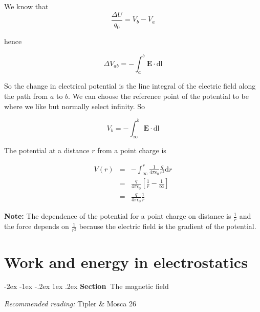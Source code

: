 \documentclass[
]{book}
\makeatletter
\renewcommand\section{%
\@startsection{section}{1}{\z@}%
              {-2ex \@plus -1ex \@minus -.2ex}%
              {1ex \@plus .2ex}%
              {\sffamily\bfseries\large\noindent Section~}}
\makeatother
\begin{document}
We know that
\begin{equation}
\label{eq:DeltaU2}
\frac{\Delta U}{q_0} = V_b - V_a
\end{equation}

hence

\begin{equation}
\label{eq:DeltaVab}
\Delta V_{ab} = -\int_a^b \mathbf{E} \cdot \mathrm{d}\mathrm{l}
\end{equation}

So the change in electrical potential is the line integral of the
electric field along the path from \(a\) to \(b\). We can choose the
reference point of the potential to be where we like but normally select
infinity. So

\begin{equation}
\label{eq:Vb}
V_b = -\int_\infty^b \mathbf{E} \cdot \mathrm{d}\mathrm{l}
\end{equation}

The potential at a distance \(r\) from a point charge is

\begin{equation}
\label{eq:V-r}
\begin{array}{rcll}
V(r) &=& -\int_\infty^r \frac{1}{4\pi\epsilon_0} \frac{q}{r^2} \mathrm{d} r \\
     &=& \frac{q}{4\pi\epsilon_0} \left[ \frac{1}{r} - \frac{1}{\infty} \right] \\
     &=& \frac{q}{4\pi\epsilon_0} \frac{1}{r}
\end{array}
\end{equation}

\textbf{Note:} The dependence of the potential for a point charge on distance
is \(\frac{1}{r}\) and the force depends on \(\frac{1}{r^2}\) because the
electric field is the gradient of the potential.

\hypertarget{work-and-energy-in-electrostatics}{%
\chapter{Work and energy in electrostatics}\label{work-and-energy-in-electrostatics}}

\hypertarget{the-magnetic-field}{%
\section{The magnetic field}\label{the-magnetic-field}}

\emph{Recommended reading:} Tipler \& Mosca 26
\end{document}

